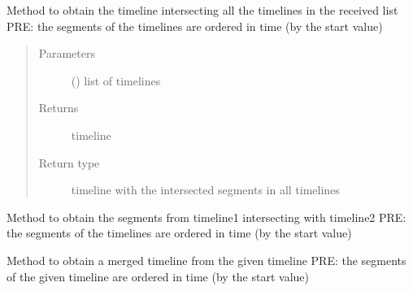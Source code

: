 
\begin{fulllineitems}
\label{\detokenize{eboa.ingestion:eboa.ingestion.functions.intersect_many_timelines}}
Method to obtain the timeline intersecting all the timelines in the received list
PRE: the segments of the timelines are ordered in time (by the start value)
\begin{quote}\begin{description}
\item[{Parameters}] \leavevmode
{} () \textendash{} list of timelines

\item[{Returns}] \leavevmode
timeline

\item[{Return type}] \leavevmode
timeline with the intersected segments in all timelines

\end{description}\end{quote}

\end{fulllineitems}


\begin{fulllineitems}
\label{\detokenize{eboa.ingestion:eboa.ingestion.functions.intersect_timelines}}
Method to obtain the segments from timeline1 intersecting with timeline2
PRE: the segments of the timelines are ordered in time (by the start value)

\end{fulllineitems}


\begin{fulllineitems}
\label{\detokenize{eboa.ingestion:eboa.ingestion.functions.merge_timeline}}
Method to obtain a merged timeline from the given timeline
PRE: the segments of the given timeline are ordered in time (by the start value)

\end{fulllineitems}

